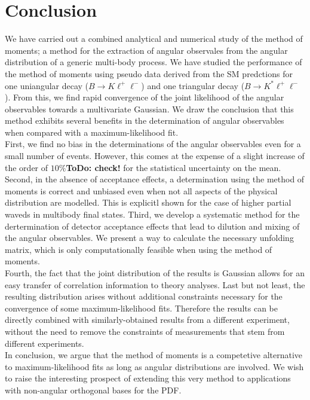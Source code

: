 \documentclass[aps,prd,reprint,nofootinbib,preprintnumbers]{revtex4}
\newcommand{\todo}[1]{{\color{red}\bf ToDo: #1}}
\begin{document}
\section{Conclusion}

We have carried out a combined analytical and numerical study of the method of moments; a method for
the extraction of angular observales from the angular distribution of a generic multi-body process.
We have studied the performance of the method of moments using pseudo data derived from the SM
predctions for one uniangular decay ($B\to K\ell^+\ell^-$) and one triangular decay ($B\to K^*\ell^+\ell^-$).
From this, we find rapid convergence of the joint likelihood of the angular observables towards a multivariate Gaussian.
We draw the conclusion that this method exhibits several benefits in the determination of angular observables when
compared with a maximum-likelihood fit.\\

First, we find no bias in the determinations of the angular observables even for a small number of events.
However, this comes at the expense of a slight increase of the order of $10\%$\todo{check!} for the statistical uncertainty
on the mean.
Second, in the absence of acceptance effects, a determination using the method of moments is correct and unbiased
even when not all aspects of the physical distribution are modelled. This is explicitl shown for the case of
higher partial waveds in multibody final states.
Third, we develop a systematic method for the dertermination of detector acceptance effects that lead to
dilution and mixing of the angular observables. We present a way to calculate the necessary unfolding matrix,
which is only computationally feasible when using the method of moments.\\
Fourth, the fact that the joint distribution of the results is Gaussian allows for an easy transfer of correlation
information to theory analyses.
Last but not least, the resulting distribution arises without additional constraints necessary for the convergence
of some maximum-likelihood fits. Therefore the results can be directly combined with similarly-obtained results from
a different experiment, without the need to remove the constraints of measurements that stem from different experiments.\\

In conclusion, we argue that the method of moments is a competetive alternative to maximum-likelihood fits as long
as angular distributions are involved. We wish to raise the interesting prospect of extending this very method to
applications with non-angular orthogonal bases for the PDF.
\end{document}
